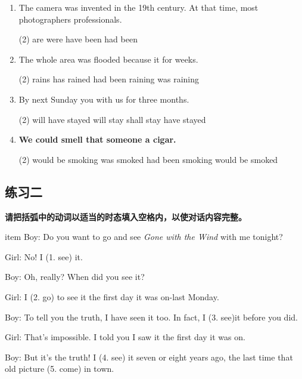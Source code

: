 \begin{enumerate}
\item The camera was invented in the 19th century. At that time, most photographers \ttu professionals.
  \begin{tasks}(2)
    \task are
    \task were
    \task have been
    \task had been
  \end{tasks}

\item The whole area was flooded because it \ttu for weeks.
  \begin{tasks}(2)
    \task rains
    \task has rained
    \task had been raining
    \task was raining
  \end{tasks}

\item By next Sunday you \ttu with us for three months.
  \begin{tasks}(2)
    \task will have stayed
    \task will stay
    \task shall stay
    \task have stayed
  \end{tasks}


\item \textbf{We could smell that someone \ttu a cigar.}
  \begin{tasks}(2)
    \task would be smoking
    \task was smoked
    \task had been smoking
    \task would be smoked
  \end{tasks}

\end{enumerate}

\subsection{练习二}

\textbf{请把括弧中的动词以适当的时态填入空格内，以使对话内容完整。}

item Boy: Do you want to go and see \textit{Gone with the Wind} with me tonight?

Girl: No! I \ttu (1. see) it.

Boy: Oh, really? When did you see it?

Girl: I \ttu (2. go) to see it the first day it was on-last Monday.

Boy: To tell you the truth, I have seen it too. In fact, I \ttu (3. see)it before you did.

Girl: That's impossible. I told you I saw it the first day it was on.

Boy: But it's the truth! I \ttu (4. see) it seven or eight years ago, the
last time that old picture \ttu (5. come) in town.


